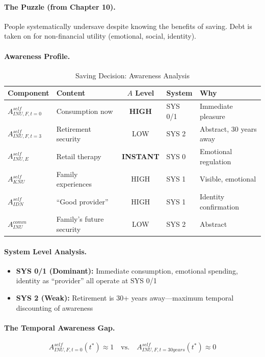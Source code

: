 \paragraph{The Puzzle (from Chapter 10).}
People systematically undersave despite knowing the benefits of saving.
Debt is taken on for non-financial utility (emotional, social, identity).

\paragraph{Awareness Profile.}

\begin{table}[htbp]
\centering
\caption{Saving Decision: Awareness Analysis}
\label{tab:saving-awareness}
\renewcommand{\arraystretch}{1.3}
\begin{tabular}{@{}llcll@{}}
\toprule
\textbf{Component} & \textbf{Content} & \textbf{$A$ Level} & \textbf{System} & \textbf{Why} \\
\midrule
$A^{self}_{INU,F,t=0}$ & Consumption now & \textbf{HIGH} & SYS 0/1 & Immediate pleasure \\
$A^{self}_{INU,F,t=3}$ & Retirement security & LOW & SYS 2 & Abstract, 30 years away \\
$A^{self}_{INU,E}$ & Retail therapy & \textbf{INSTANT} & SYS 0 & Emotional regulation \\
$A^{self}_{KNU}$ & Family experiences & HIGH & SYS 1 & Visible, emotional \\
$A^{self}_{IDN}$ & ``Good provider'' & HIGH & SYS 1 & Identity confirmation \\
$A^{comm}_{INU}$ & Family's future security & LOW & SYS 2 & Abstract \\
\bottomrule
\end{tabular}
\end{table}

\paragraph{System Level Analysis.}
\begin{itemize}
\item \textbf{SYS 0/1 (Dominant):} Immediate consumption, emotional spending, 
identity as ``provider'' all operate at SYS 0/1
\item \textbf{SYS 2 (Weak):} Retirement is 30+ years away---maximum temporal 
discounting of awareness
\end{itemize}

\paragraph{The Temporal Awareness Gap.}
\begin{equation}
A^{self}_{INU,F,t=0}(t^*) \approx 1 \quad \text{vs.} \quad A^{self}_{INU,F,t=30years}(t^*) \approx 0
\end{equation}

